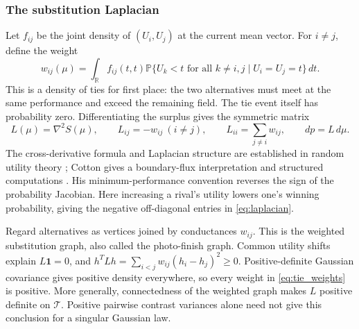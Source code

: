 \documentclass[11pt]{amsart}
\newcommand{\R}{\mathbb R}
\newcommand{\Prob}{\mathbb P}
\newcommand{\one}{\mathbf 1}
\theoremstyle{definition}
\begin{document}
\subsubsection{The substitution Laplacian}
Let $f_{ij}$ be the joint density of $(U_i,U_j)$ at the current mean vector.
For $i\ne j$, define the weight
\begin{equation}\label{eq:tie_weights}
 w_{ij}(\mu)=\int_{\R}f_{ij}(t,t)
 \Prob\{U_k<t\text{ for all }k\ne i,j\mid U_i=U_j=t\}\,dt.
\end{equation}
This is a density of ties for first place: the two alternatives must meet
at the same performance and exceed the remaining field. The tie event itself
has probability zero. Differentiating the surplus gives the symmetric matrix
\begin{equation}\label{eq:laplacian}
 L(\mu)=\nabla^2S(\mu),\qquad
 L_{ij}=-w_{ij}\ (i\ne j),\qquad L_{ii}=\sum_{j\ne i}w_{ij},
 \qquad dp=L\,d\mu.
\end{equation}
The cross-derivative formula and Laplacian structure are established in
random utility theory \cite{muller2019}; Cotton gives a boundary-flux
interpretation and structured computations \cite{cotton2026}. His
minimum-performance convention reverses the sign of the probability Jacobian.
Here increasing a rival's utility lowers one's winning probability, giving
the negative off-diagonal entries in \eqref{eq:laplacian}.

Regard alternatives as vertices joined by conductances $w_{ij}$. This is the
weighted substitution graph, also called the photo-finish graph. Common
utility shifts explain $L\one=0$, and
$h^TLh=\sum_{i<j}w_{ij}(h_i-h_j)^2\geq0$.
Positive-definite Gaussian covariance gives positive density everywhere, so
every weight in \eqref{eq:tie_weights} is positive. More generally, connectedness
of the weighted graph makes $L$ positive definite on $\mathcal T$. Positive pairwise
contrast variances alone need not give this conclusion for a singular
Gaussian law.
\end{document}
